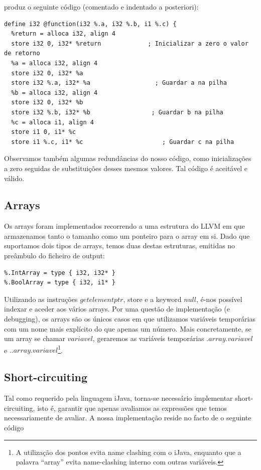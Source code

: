 \documentclass[11pt,a4paper]{article}
\begin{document}
produz o seguinte código (comentado e indentado a posteriori):
\begin{lstlisting}
define i32 @function(i32 %.a, i32 %.b, i1 %.c) {
  %return = alloca i32, align 4
  store i32 0, i32* %return             ; Inicializar a zero o valor de retorno
  %a = alloca i32, align 4               
  store i32 0, i32* %a                     
  store i32 %.a, i32* %a                  ; Guardar a na pilha
  %b = alloca i32, align 4
  store i32 0, i32* %b
  store i32 %.b, i32* %b                 ; Guardar b na pilha
  %c = alloca i1, align 4
  store i1 0, i1* %c    
  store i1 %.c, i1* %c                      ; Guardar c na pilha
\end{lstlisting}

Observamos também algumas redundâncias do nosso código, como inicializações a zero seguidas de substituições desses mesmos valores. Tal código é aceitável e válido.

\subsection{Arrays}

Os arrays foram implementados recorrendo a uma estrutura do LLVM em que armazenamos tanto o tamanho como um ponteiro para o array em si. Dado que suportamos dois tipos de arrays, temos duas destas estruturas, emitidas no preâmbulo do ficheiro de output:

\begin{lstlisting}
%.IntArray = type { i32, i32* }
%.BoolArray = type { i32, i1* }
\end{lstlisting}

Utilizando as instruções $getelementptr$, store e a keyword $null$, é-nos possível indexar e aceder aos vários arrays. Por uma questão de implementação (e debugging), os arrays são os únicos casos em que utilizamos variáveis temporárias com um nome mais explícito do que apenas um número. Mais concretamente, se um array se chamar $variavel$, geraremos as variáveis temporárias $.array.variavel$ e $..array.variavel$\footnote{A utilização dos pontos evita name clashing com o iJava, enquanto que a palavra ``array'' evita name-clashing interno com outras variáveis.}.

\subsection{Short-circuiting}

Tal como requerido pela linguagem iJava, torna-se necessário implementar short-circuiting, isto é, garantir que apenas avaliamos as expressões que temos necessariamente de avaliar. A nossa implementação reside no facto de o seguinte código
\end{document}
